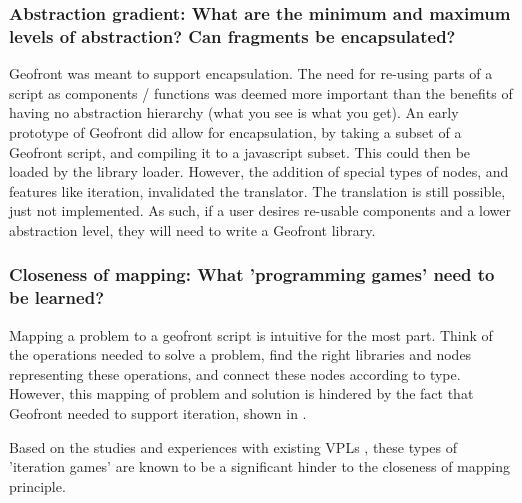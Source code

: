 \subsubsection*{Abstraction gradient: What are the minimum and maximum levels of abstraction? Can fragments be encapsulated?}

Geofront was meant to support encapsulation. 
The need for re-using parts of a script as components / functions was deemed more important than the benefits of having no abstraction hierarchy (what you see is what you get).
An early prototype of Geofront did allow for encapsulation, by taking a subset of a Geofront script, and compiling it to a javascript subset. This could then be loaded by the library loader. 
However, the addition of special types of nodes, and features like iteration, invalidated the  translator.
The translation is still possible, just not implemented.  
As such, if a user desires re-usable components and a lower abstraction level, they will need to write a Geofront library.


\subsubsection*{Closeness of mapping: What 'programming games' need to be learned?}

Mapping a problem to a geofront script is intuitive for the most part.
Think of the operations needed to solve a problem, 
find the right libraries and nodes representing these operations,
and connect these nodes according to type. 
However, this mapping of problem and solution is hindered by the fact that Geofront needed to support iteration, shown in . 

Based on the studies and experiences with existing VPLs , these types of 'iteration games' are known to be a significant hinder to the closeness of mapping principle.

